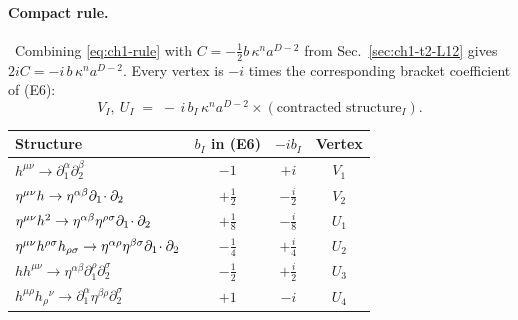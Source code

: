 \paragraph{Compact rule.} \tD\ Combining \eqref{eq:ch1-rule} with
$C=-\tfrac12b\,\kappa^na^{D-2}$ from Sec.~\ref{sec:ch1-t2-L12} gives
$2iC=-i\,b\,\kappa^na^{D-2}$. Every vertex is $-i$ times the corresponding
bracket coefficient of (E6):
\begin{equation}
V_I,\ U_I\;=\;-\,i\,b_I\,\kappa^n a^{D-2}\times(\text{contracted structure}_I).
\label{eq:ch1-compact}
\end{equation}
\begin{center}
\small
\begin{tabular}{lccc}
\toprule
Structure & $b_I$ in (E6) & $-ib_I$ & Vertex\\
\midrule
$h^{\mu\nu}\to\partial_1^\alpha\partial_2^\beta$ & $-1$ & $+i$ & $V_1$\\
$\eta^{\mu\nu}h\to\eta^{\alpha\beta}\partial_1\!\cdot\partial_2$ & $+\tfrac12$ & $-\tfrac i2$ & $V_2$\\
$\eta^{\mu\nu}h^2\to\eta^{\alpha\beta}\eta^{\rho\sigma}\partial_1\!\cdot\partial_2$ & $+\tfrac18$ & $-\tfrac i8$ & $U_1$\\
$\eta^{\mu\nu}h^{\rho\sigma}h_{\rho\sigma}\to\eta^{\alpha\rho}\eta^{\beta\sigma}\partial_1\!\cdot\partial_2$ & $-\tfrac14$ & $+\tfrac i4$ & $U_2$\\
$hh^{\mu\nu}\to\eta^{\alpha\beta}\partial_1^\rho\partial_2^\sigma$ & $-\tfrac12$ & $+\tfrac i2$ & $U_3$\\
$h^{\mu\rho}h_\rho{}^\nu\to\partial_1^\alpha\eta^{\beta\rho}\partial_2^\sigma$ & $+1$ & $-i$ & $U_4$\\
\bottomrule
\end{tabular}
\end{center}

